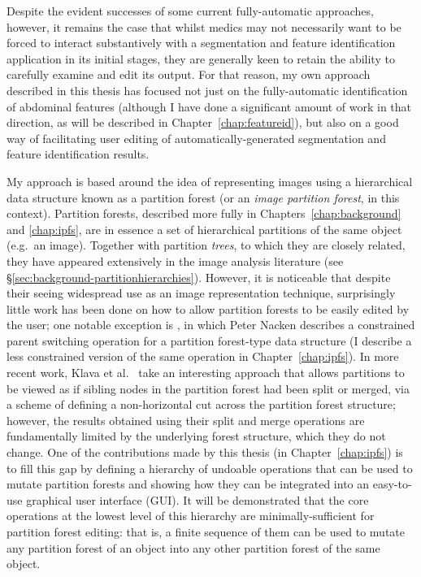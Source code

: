 Despite the evident successes of some current fully-automatic approaches, however, it remains the case that whilst medics may not necessarily want to be forced to interact substantively with a segmentation and feature identification application in its initial stages, they are generally keen to retain the ability to carefully examine and edit its output. For that reason, my own approach described in this thesis has focused not just on the fully-automatic identification of abdominal features (although I have done a significant amount of work in that direction, as will be described in Chapter~\ref{chap:featureid}), but also on a good way of facilitating user editing of automatically-generated segmentation and feature identification results.

My approach is based around the idea of representing images using a hierarchical data structure known as a partition forest (or an \emph{image partition forest}, in this context). Partition forests, described more fully in Chapters~\ref{chap:background} and \ref{chap:ipfs}, are in essence a set of hierarchical partitions of the same object (e.g.~an image). Together with partition \emph{trees}, to which they are closely related, they have appeared extensively in the image analysis literature (see \S\ref{sec:background-partitionhierarchies}). However, it is noticeable that despite their seeing widespread use as an image representation technique, surprisingly little work has been done on how to allow partition forests to be easily edited by the user; one notable exception is \cite{nacken95}, in which Peter Nacken describes a constrained parent switching operation for a partition forest-type data structure (I describe a less constrained version of the same operation in Chapter~\ref{chap:ipfs}). In more recent work, Klava et al.~\cite{klava09} take an interesting approach that allows partitions to be viewed as if sibling nodes in the partition forest had been split or merged, via a scheme of defining a non-horizontal cut across the partition forest structure; however, the results obtained using their split and merge operations are fundamentally limited by the underlying forest structure, which they do not change. One of the contributions made by this thesis (in Chapter~\ref{chap:ipfs}) is to fill this gap by defining a hierarchy of undoable operations that can be used to mutate partition forests and showing how they can be integrated into an easy-to-use graphical user interface (GUI). It will be demonstrated that the core operations at the lowest level of this hierarchy are minimally-sufficient for partition forest editing: that is, a finite sequence of them can be used to mutate any partition forest of an object into any other partition forest of the same object.

